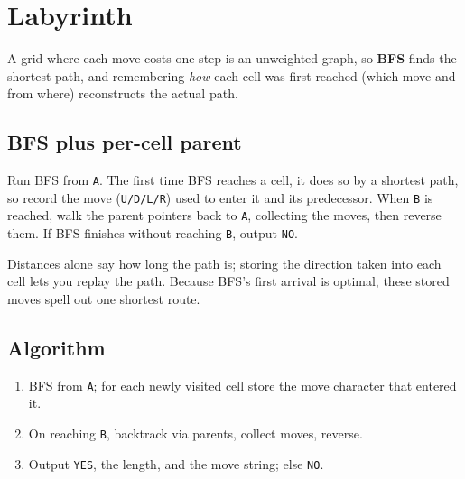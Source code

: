 \section{Labyrinth}
\label{sec:cses-labyrinth}


\begin{patternbox}
A grid where each move costs one step is an unweighted graph, so
\textbf{BFS} finds the shortest path, and remembering \emph{how} each cell
was first reached (which move and from where) reconstructs the actual path.
\end{patternbox}

\subsection*{BFS plus per-cell parent}

Run BFS from \texttt{A}. The first time BFS reaches a cell, it does so by a
shortest path, so record the move (\texttt{U/D/L/R}) used to enter it and
its predecessor. When \texttt{B} is reached, walk the parent pointers back
to \texttt{A}, collecting the moves, then reverse them. If BFS finishes
without reaching \texttt{B}, output \texttt{NO}.

\begin{ideabox}
Distances alone say how long the path is; storing the direction taken into
each cell lets you replay the path. Because BFS's first arrival is optimal,
these stored moves spell out one shortest route.
\end{ideabox}

\subsection*{Algorithm}

\begin{enumerate}
  \item BFS from \texttt{A}; for each newly visited cell store the move
        character that entered it.
  \item On reaching \texttt{B}, backtrack via parents, collect moves,
        reverse.
  \item Output \texttt{YES}, the length, and the move string; else
        \texttt{NO}.
\end{enumerate}

